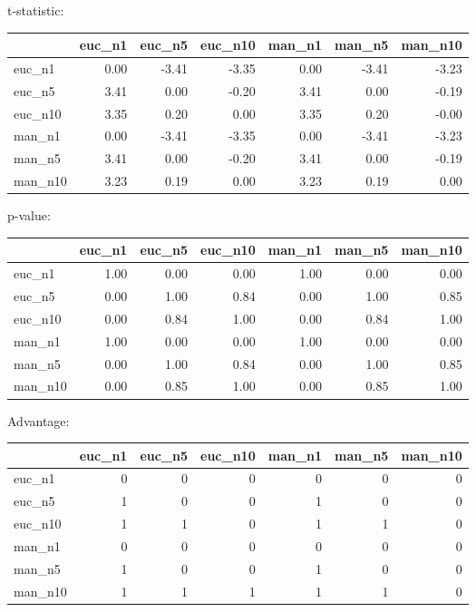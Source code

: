 t-statistic:
 \begin{tabular}{lrrrrrr}
\hline
         &   euc\_n1 &   euc\_n5 &   euc\_n10 &   man\_n1 &   man\_n5 &   man\_n10 \\
\hline
 euc\_n1  &     0.00 &    -3.41 &     -3.35 &     0.00 &    -3.41 &     -3.23 \\
 euc\_n5  &     3.41 &     0.00 &     -0.20 &     3.41 &     0.00 &     -0.19 \\
 euc\_n10 &     3.35 &     0.20 &      0.00 &     3.35 &     0.20 &     -0.00 \\
 man\_n1  &     0.00 &    -3.41 &     -3.35 &     0.00 &    -3.41 &     -3.23 \\
 man\_n5  &     3.41 &     0.00 &     -0.20 &     3.41 &     0.00 &     -0.19 \\
 man\_n10 &     3.23 &     0.19 &      0.00 &     3.23 &     0.19 &      0.00 \\
\hline
\end{tabular} 

p-value:
 \begin{tabular}{lrrrrrr}
\hline
         &   euc\_n1 &   euc\_n5 &   euc\_n10 &   man\_n1 &   man\_n5 &   man\_n10 \\
\hline
 euc\_n1  &     1.00 &     0.00 &      0.00 &     1.00 &     0.00 &      0.00 \\
 euc\_n5  &     0.00 &     1.00 &      0.84 &     0.00 &     1.00 &      0.85 \\
 euc\_n10 &     0.00 &     0.84 &      1.00 &     0.00 &     0.84 &      1.00 \\
 man\_n1  &     1.00 &     0.00 &      0.00 &     1.00 &     0.00 &      0.00 \\
 man\_n5  &     0.00 &     1.00 &      0.84 &     0.00 &     1.00 &      0.85 \\
 man\_n10 &     0.00 &     0.85 &      1.00 &     0.00 &     0.85 &      1.00 \\
\hline
\end{tabular} 

Advantage:
 \begin{tabular}{lrrrrrr}
\hline
         &   euc\_n1 &   euc\_n5 &   euc\_n10 &   man\_n1 &   man\_n5 &   man\_n10 \\
\hline
 euc\_n1  &        0 &        0 &         0 &        0 &        0 &         0 \\
 euc\_n5  &        1 &        0 &         0 &        1 &        0 &         0 \\
 euc\_n10 &        1 &        1 &         0 &        1 &        1 &         0 \\
 man\_n1  &        0 &        0 &         0 &        0 &        0 &         0 \\
 man\_n5  &        1 &        0 &         0 &        1 &        0 &         0 \\
 man\_n10 &        1 &        1 &         1 &        1 &        1 &         0 \\
\hline
\end{tabular} 

